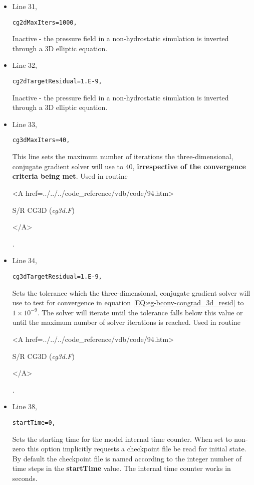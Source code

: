\begin{itemize}
\item Line 31,
\begin{verbatim}
cg2dMaxIters=1000,
\end{verbatim}
Inactive - the pressure field in a non-hydrostatic simulation is inverted through a 3D
elliptic equation.


\item Line 32,
\begin{verbatim}
cg2dTargetResidual=1.E-9,
\end{verbatim}
Inactive - the pressure field in a non-hydrostatic simulation is inverted through a 3D
elliptic equation.


\item Line 33,
\begin{verbatim}
cg3dMaxIters=40,
\end{verbatim}
This line sets the  maximum number of iterations the three-dimensional, conjugate
gradient solver will use to 40, {\bf irrespective of the convergence 
criteria being met}. Used in routine
{\it
\begin{rawhtml} <A href=../../../code_reference/vdb/code/94.htm> \end{rawhtml}
S/R CG3D ({\it cg3d.F})
\begin{rawhtml} </A>\end{rawhtml}
}. 



\item Line 34,
\begin{verbatim}
cg3dTargetResidual=1.E-9,
\end{verbatim}
Sets the tolerance which the three-dimensional, conjugate
gradient solver will use to test for convergence in equation 
\ref{EQ:eg-bconv-congrad_3d_resid} to $1 \times 10^{-9}$.
The solver will iterate until the 
tolerance falls below this value or until the maximum number of
solver iterations is reached. Used in routine
{\it
\begin{rawhtml} <A href=../../../code_reference/vdb/code/94.htm> \end{rawhtml}
S/R CG3D ({\it cg3d.F})
\begin{rawhtml} </A>\end{rawhtml}
}. 


\item Line 38,
\begin{verbatim}
startTime=0,
\end{verbatim}
Sets the starting time for the model internal time counter.
When set to non-zero this option implicitly requests a 
checkpoint file be read for initial state.
By default the checkpoint file is named according to
the integer number of time steps in the {\bf startTime} value.
The internal time counter works in seconds.


\end{itemize}
